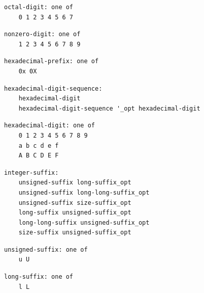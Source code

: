\noindent\textbf{\texttt{}}\par
\begin{lstlisting}
octal-digit: one of
    0 1 2 3 4 5 6 7
\end{lstlisting}

\noindent\textbf{\texttt{}}\par
\begin{lstlisting}
nonzero-digit: one of
    1 2 3 4 5 6 7 8 9
\end{lstlisting}

\noindent\textbf{\texttt{}}\par
\begin{lstlisting}
hexadecimal-prefix: one of
    0x 0X
\end{lstlisting}

\noindent\textbf{\texttt{}}\par
\begin{lstlisting}
hexadecimal-digit-sequence:
    hexadecimal-digit
    hexadecimal-digit-sequence '_opt hexadecimal-digit
\end{lstlisting}

\noindent\textbf{\texttt{}}\par
\begin{lstlisting}
hexadecimal-digit: one of
    0 1 2 3 4 5 6 7 8 9
    a b c d e f
    A B C D E F
\end{lstlisting}

\noindent\textbf{\texttt{}}\par
\begin{lstlisting}
integer-suffix:
    unsigned-suffix long-suffix_opt
    unsigned-suffix long-long-suffix_opt
    unsigned-suffix size-suffix_opt
    long-suffix unsigned-suffix_opt
    long-long-suffix unsigned-suffix_opt
    size-suffix unsigned-suffix_opt
\end{lstlisting}

\noindent\textbf{\texttt{}}\par
\begin{lstlisting}
unsigned-suffix: one of
    u U
\end{lstlisting}

\noindent\textbf{\texttt{}}\par
\begin{lstlisting}
long-suffix: one of
    l L
\end{lstlisting}

